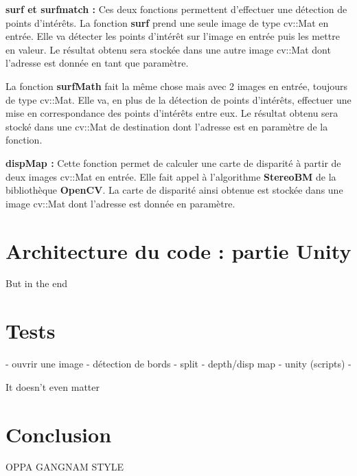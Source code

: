 \documentclass[a4paper]{article}
\begin{document}
\textbf{surf et surfmatch :} Ces deux fonctions permettent d'effectuer une détection
de points d'intérêts. La fonction \textbf{surf} prend une seule image de type
cv::Mat en entrée. Elle va détecter les points d'intérêt sur l'image en entrée puis
les mettre en valeur. Le résultat obtenu sera stockée dans une autre image cv::Mat
dont l'adresse est donnée en tant que paramètre.


La fonction \textbf{surfMath} fait la même chose mais avec 2 images en entrée,
toujours de type cv::Mat. Elle va, en plus de la détection de points d'intérêts,
effectuer une mise en correspondance des points d'intérêts entre eux. Le résultat
obtenu sera stocké dans une cv::Mat de destination dont l'adresse est en paramètre
de la fonction.


\textbf{dispMap :} Cette fonction permet de calculer une carte de disparité à
partir de deux images cv::Mat en entrée. Elle fait appel à l'algorithme
\textbf{StereoBM} de la bibliothèque \textbf{OpenCV}. La carte de disparité ainsi
obtenue est stockée dans une image cv::Mat dont l'adresse est donnée en paramètre.


\section{Architecture du code : partie Unity}

But in the end


\section{Tests}

- ouvrir une image
- détection de bords
- split
- depth/disp map
- unity (scripts)
- 

It doesn't even matter


\section{Conclusion}

OPPA GANGNAM STYLE

\end{document}
